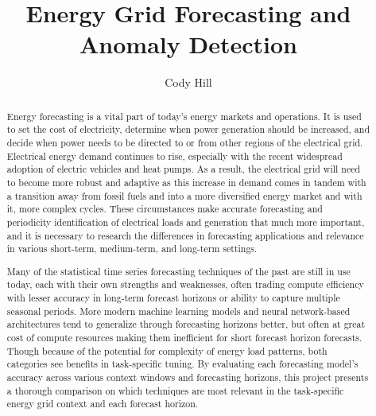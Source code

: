 \documentclass[sigconf]{acmart}
\begin{document}
\title{Energy Grid Forecasting and Anomaly Detection}


\author{Cody Hill}


\renewcommand{\shortauthors}{C. Hill}

\begin{abstract}
Energy forecasting is a vital part of today's energy markets and operations. It is used to set the cost of electricity, determine when power generation should be increased, and decide when power needs to be directed to or from other regions of the electrical grid. Electrical energy demand continues to rise, especially with the recent widespread adoption of electric vehicles and heat pumps. As a result, the electrical grid will need to become more robust and adaptive as this increase in demand comes in tandem with a transition away from fossil fuels and into a more diversified energy market and with it, more complex cycles. These circumstances make accurate forecasting and periodicity identification of electrical loads and generation that much more important, and it is necessary to research the differences in forecasting applications and relevance in various short-term, medium-term, and long-term settings.

Many of the statistical time series forecasting techniques of the past are still in use today, each with their own strengths and weaknesses, often trading compute efficiency with lesser accuracy in long-term forecast horizons or ability to capture multiple seasonal periods. More modern machine learning models and neural network-based architectures tend to generalize through forecasting horizons better, but often at great cost of compute resources making them inefficient for short forecast horizon forecasts. Though because of the potential for complexity of energy load patterns, both categories see benefits in task-specific tuning. By evaluating each forecasting model's accuracy across various context windows and forecasting horizons, this project presents a thorough comparison on which techniques are most relevant in the task-specific energy grid context and each forecast horizon.
\end{abstract}
\end{document}
